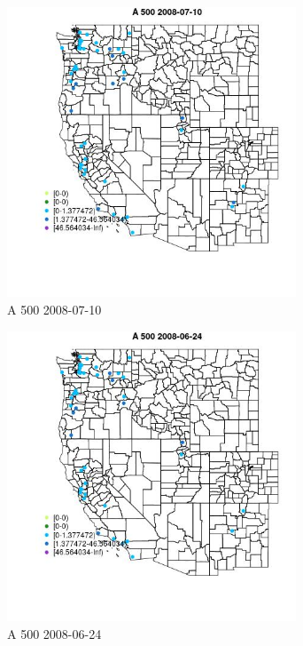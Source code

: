 \begin{figure} 
\centering  
\includegraphics[width=0.77\textwidth]{Code_Outputs/Report_ML_input_PM25_Step4_part_e_de_duplicated_aves_MapObsA_5002008-07-10.jpg} 
\caption{\label{fig:Report_ML_input_PM25_Step4_part_e_de_duplicated_avesMapObsA_5002008-07-10}A 500 2008-07-10} 
\end{figure} 
 

\begin{figure} 
\centering  
\includegraphics[width=0.77\textwidth]{Code_Outputs/Report_ML_input_PM25_Step4_part_e_de_duplicated_aves_MapObsA_5002008-06-24.jpg} 
\caption{\label{fig:Report_ML_input_PM25_Step4_part_e_de_duplicated_avesMapObsA_5002008-06-24}A 500 2008-06-24} 
\end{figure} 
 

